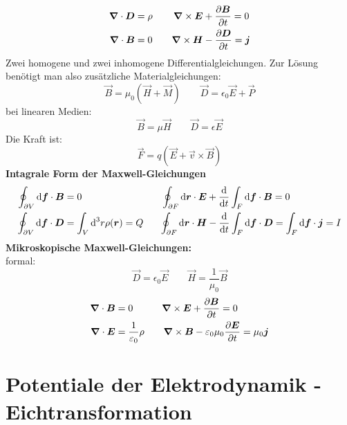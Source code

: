 \begin{align*}
\bm{\nabla} \cdot \bm{D} &= \rho \qquad \, \bm{\nabla} \times \bm{E} + \frac{\partial \bm{B}}{\partial t} = 0 \\
\bm{\nabla} \cdot \bm{B} &= 0 \qquad \bm{\nabla} \times \bm{H} - \frac{\partial \bm{D}}{\partial t} = \bm{j}
\end{align*}
Zwei homogene und zwei inhomogene Differentialgleichungen. Zur Lösung benötigt man also zusätzliche Materialgleichungen:
\begin{equation*}
\vec{B} = \mu_0 (\vec{H} + \vec{M}) \qquad \vec{D} = \epsilon_0\vec{E} + \vec{P}
\end{equation*}
bei linearen Medien:
\begin{equation*}
\vec{B} = \mu \vec{H} \qquad \vec{D} = \epsilon \vec{E}
\end{equation*}
Die Kraft ist:
\begin{equation*}
\vec{F} = q (\vec{E} + \vec{v} \times \vec{B})
\end{equation*}
\textbf{Intagrale Form der Maxwell-Gleichungen}
\begin{align*}
\oint_{\partial V} \textrm{d} \bm{f} \cdot \bm{B} &= 0  \qquad \qquad \qquad \qquad \: \oint_{\partial F} \textrm{d} \bm{r} \cdot \bm{E} + \frac{\textrm{d} }{\textrm{d} t} \int_F \textrm{d} \bm{f} \cdot \bm{B} = 0 \\
\oint_{\partial V} \textrm{d} \bm{f} \cdot \bm{D} &= \int_V \textrm{d}^3 r \rho(\bm{r}) = Q \quad \ \ \oint_{\partial F} \textrm{d} \bm{r} \cdot \bm{H} - \frac{\textrm{d} }{\textrm{d} t} \int_F \textrm{d} \bm{f} \cdot \bm{D} = \int_F \textrm{d} \bm{f} \cdot \bm{j} = I
\end{align*}
\textbf{Mikroskopische Maxwell-Gleichungen:}\\
formal:
\begin{equation*}
\vec{D} = \epsilon_0 \vec{E} \qquad \vec{H} = \frac{1}{\mu_0} \vec{B}
\end{equation*}
\begin{align*}
\bm{\nabla} \cdot \bm{B} &= 0 \qquad \quad \bm{\nabla} \times \bm{E} + \frac{\partial \bm{B}}{\partial t} = 0\\
\bm{\nabla} \cdot \bm{E} &= \frac{1}{\varepsilon_0} \rho \qquad \bm{\nabla} \times \bm{B} - \varepsilon_0 \mu_0 \frac{\partial \bm{E}}{\partial t} = \mu_0 \bm{j}
\end{align*}

\section{Potentiale der Elektrodynamik - Eichtransformation}

